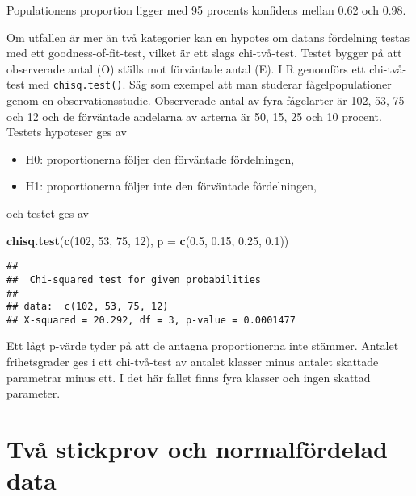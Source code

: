 \documentclass[
]{book}
\newenvironment{Shaded}{\begin{snugshade}}{\end{snugshade}}
\newcommand{\AttributeTok}[1]{\textcolor[rgb]{0.13,0.29,0.53}{#1}}
\newcommand{\DecValTok}[1]{\textcolor[rgb]{0.00,0.00,0.81}{#1}}
\newcommand{\FloatTok}[1]{\textcolor[rgb]{0.00,0.00,0.81}{#1}}
\newcommand{\FunctionTok}[1]{\textcolor[rgb]{0.13,0.29,0.53}{\textbf{#1}}}
\newcommand{\NormalTok}[1]{#1}
\providecommand{\tightlist}{%
  \setlength{\itemsep}{0pt}\setlength{\parskip}{0pt}}
\theoremstyle{definition}
\theoremstyle{definition}
\theoremstyle{definition}
\theoremstyle{definition}
\theoremstyle{remark}
\begin{document}
Populationens proportion ligger med 95 procents konfidens mellan 0.62 och 0.98.

Om utfallen är mer än två kategorier kan en hypotes om datans fördelning testas med ett goodness-of-fit-test, vilket är ett slags chi-två-test. Testet bygger på att observerade antal (O) ställs mot förväntade antal (E). I R genomförs ett chi-två-test med \texttt{chisq.test()}. Säg som exempel att man studerar fågelpopulationer genom en observationsstudie. Observerade antal av fyra fågelarter är 102, 53, 75 och 12 och de förväntade andelarna av arterna är 50, 15, 25 och 10 procent. Testets hypoteser ges av

\begin{itemize}
\tightlist
\item
  H0: proportionerna följer den förväntade fördelningen,
\item
  H1: proportionerna följer inte den förväntade fördelningen,
\end{itemize}

och testet ges av

\begin{Shaded}
\begin{Highlighting}[]
\FunctionTok{chisq.test}\NormalTok{(}\FunctionTok{c}\NormalTok{(}\DecValTok{102}\NormalTok{, }\DecValTok{53}\NormalTok{, }\DecValTok{75}\NormalTok{, }\DecValTok{12}\NormalTok{), }\AttributeTok{p =} \FunctionTok{c}\NormalTok{(}\FloatTok{0.5}\NormalTok{, }\FloatTok{0.15}\NormalTok{, }\FloatTok{0.25}\NormalTok{, }\FloatTok{0.1}\NormalTok{))}
\end{Highlighting}
\end{Shaded}

\begin{verbatim}
## 
##  Chi-squared test for given probabilities
## 
## data:  c(102, 53, 75, 12)
## X-squared = 20.292, df = 3, p-value = 0.0001477
\end{verbatim}

Ett lågt p-värde tyder på att de antagna proportionerna inte stämmer. Antalet frihetsgrader ges i ett chi-två-test av antalet klasser minus antalet skattade parametrar minus ett. I det här fallet finns fyra klasser och ingen skattad parameter.

\hypertarget{tvuxe5-stickprov-och-normalfuxf6rdelad-data}{%
\section{Två stickprov och normalfördelad data}\label{tvuxe5-stickprov-och-normalfuxf6rdelad-data}}
\end{document}
